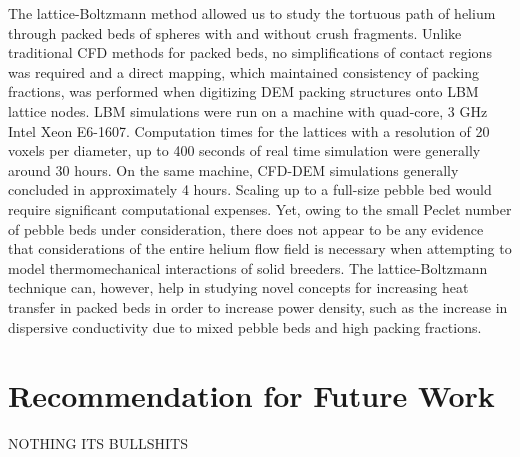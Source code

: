 The lattice-Boltzmann method allowed us to study the tortuous path of helium through packed beds of spheres with and without crush fragments. Unlike traditional CFD methods for packed beds, no simplifications of contact regions was required and a direct mapping, which maintained consistency of packing fractions, was performed when digitizing DEM packing structures onto LBM lattice nodes. LBM simulations were run on a machine with quad-core, 3 GHz Intel Xeon E6-1607. Computation times for the lattices with a resolution of 20 voxels per diameter, up to 400 seconds of real time simulation were generally around 30 hours. On the same machine, CFD-DEM simulations generally concluded in approximately 4 hours. Scaling up to a full-size pebble bed would require significant computational expenses. Yet, owing to the small Peclet number of pebble beds under consideration, there does not appear to be any evidence that considerations of the entire helium flow field is necessary when attempting to model thermomechanical interactions of solid breeders. The lattice-Boltzmann technique can, however, help in studying novel concepts for increasing heat transfer in packed beds in order to increase power density, such as the increase in dispersive conductivity due to mixed pebble beds and high packing fractions.

\section{Recommendation for Future Work}
NOTHING ITS BULLSHITS